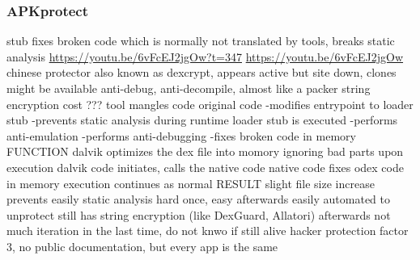 \subsubsection{APKprotect}\label{subsubsection:counter-reengineering-propack-apkprotect}
stub fixes broken code which is normally not translated by tools, breaks static analysis \newline
\url{https://youtu.be/6vFcEJ2jgOw?t=347}\newline
\url{https://youtu.be/6vFcEJ2jgOw}\newline
chinese protector\newline
also known as dexcrypt, appears active but site down, clones might be available\newline
anti-debug, anti-decompile, almost like a packer\newline
string encryption\newline
cost ???\newline
tool mangles code original code\newline
-modifies entrypoint to loader stub\newline
-prevents static analysis\newline
during runtime loader stub is executed\newline
-performs anti-emulation\newline
-performs anti-debugging\newline
-fixes broken code in memory\newline
FUNCTION\newline
dalvik optimizes the dex file into momory ignoring bad parts\newline
upon execution dalvik code initiates, calls the native code\newline
native code fixes odex code in memory\newline
execution continues as normal\newline
RESULT\newline
slight file size increase\newline
prevents easily static analysis\newline
hard once, easy afterwards\newline
easily automated to unprotect\newline
still has string encryption (like DexGuard, Allatori) afterwards\newline
not much iteration in the last time, do not knwo if still alive\newline
hacker protection factor 3, no public documentation, but every app is the same\newline

